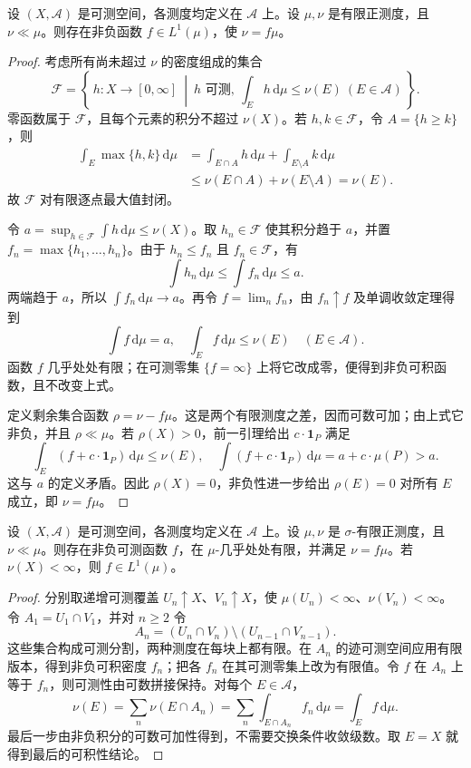 \begin{theorem}\label{b1:thm:radon-nikodym-finite}
设 \((X,\mathcal A)\) 是可测空间，各测度均定义在 \(\mathcal A\) 上。设 \(\mu,\nu\) 是有限正测度，且 \(\nu\ll\mu\)。则存在非负函数 \(f\in L^1(\mu)\)，使 \(\nu=f\mu\)。
\end{theorem}
\begin{proof}
考虑所有尚未超过 \(\nu\) 的密度组成的集合
\[
\mathcal F=\left\{\,h:X\rightarrow[0,\infty]\ \middle|\ h\text{ 可测},\
\int_Eh\,\mathrm d\mu\leq\nu(E)\ (E\in\mathcal A)\,\right\}.
\]
零函数属于 \(\mathcal F\)，且每个元素的积分不超过 \(\nu(X)\)。若 \(h,k\in\mathcal F\)，令 \(A=\{h\geq k\}\)，则
\[
\begin{aligned}
\int_E\max\{h,k\}\,\mathrm d\mu
&=\int_{E\cap A}h\,\mathrm d\mu+\int_{E\setminus A}k\,\mathrm d\mu\\
&\leq\nu(E\cap A)+\nu(E\setminus A)=\nu(E).
\end{aligned}
\]
故 \(\mathcal F\) 对有限逐点最大值封闭。

令 \(a=\sup_{h\in\mathcal F}\int h\,\mathrm d\mu\leq\nu(X)\)。取 \(h_n\in\mathcal F\) 使其积分趋于 \(a\)，并置 \(f_n=\max\{h_1,\ldots,h_n\}\)。由于 \(h_n\leq f_n\) 且 \(f_n\in\mathcal F\)，有
\[
\int h_n\,\mathrm d\mu\leq\int f_n\,\mathrm d\mu\leq a.
\]
两端趋于 \(a\)，所以 \(\int f_n\,\mathrm d\mu\to a\)。再令 \(f=\lim_n f_n\)，由 \(f_n\uparrow f\) 及单调收敛定理得到
\[
\int f\,\mathrm d\mu=a,\quad \int_E f\,\mathrm d\mu\leq\nu(E)
\quad(E\in\mathcal A).
\]
函数 \(f\) 几乎处处有限；在可测零集 \(\{f=\infty\}\) 上将它改成零，便得到非负可积函数，且不改变上式。

定义剩余集合函数 \(\rho=\nu-f\mu\)。这是两个有限测度之差，因而可数可加；由上式它非负，并且 \(\rho\ll\mu\)。若 \(\rho(X)>0\)，前一引理给出 \(c\cdot\mathbf1_P\) 满足
\[
\int_E(f+c\cdot\mathbf1_P)\,\mathrm d\mu\leq\nu(E),\quad
\int(f+c\cdot\mathbf1_P)\,\mathrm d\mu=a+c\cdot\mu(P)>a.
\]
这与 \(a\) 的定义矛盾。因此 \(\rho(X)=0\)，非负性进一步给出 \(\rho(E)=0\) 对所有 \(E\) 成立，即 \(\nu=f\mu\)。
\end{proof}

\begin{theorem}\label{b1:thm:radon-nikodym}
设 \((X,\mathcal A)\) 是可测空间，各测度均定义在 \(\mathcal A\) 上。设 \(\mu,\nu\) 是 \(\sigma\)-有限正测度，且 \(\nu\ll\mu\)。则存在非负可测函数 \(f\)，在 \(\mu\)-几乎处处有限，并满足 \(\nu=f\mu\)。若 \(\nu(X)<\infty\)，则 \(f\in L^1(\mu)\)。
\end{theorem}
\begin{proof}
分别取递增可测覆盖 \(U_n\uparrow X\)、\(V_n\uparrow X\)，使 \(\mu(U_n)<\infty\)、\(\nu(V_n)<\infty\)。令 \(A_1=U_1\cap V_1\)，并对 \(n\geq2\) 令
\[
A_n=(U_n\cap V_n)\setminus(U_{n-1}\cap V_{n-1}).
\]
这些集合构成可测分割，两种测度在每块上都有限。在 \(A_n\) 的迹可测空间应用有限版本，得到非负可积密度 \(f_n\)；把各 \(f_n\) 在其可测零集上改为有限值。令 \(f\) 在 \(A_n\) 上等于 \(f_n\)，则可测性由可数拼接保持。对每个 \(E\in\mathcal A\)，
\[
\nu(E)=\sum_n\nu(E\cap A_n)
=\sum_n\int_{E\cap A_n} f_n\,\mathrm d\mu
=\int_E f\,\mathrm d\mu.
\]
最后一步由非负积分的可数可加性得到，不需要交换条件收敛级数。取 \(E=X\) 就得到最后的可积性结论。
\end{proof}

